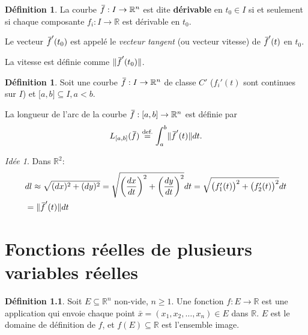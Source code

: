 \documentclass{report}
\theoremstyle{plain}
\theoremstyle{definition}
\newtheorem{defn}[thm]{Définition}
\theoremstyle{remark}
\newtheorem*{idea}{Idée}
\newcommand*\eqdef{\; \stackrel{ \mathclap{ \normalfont\text{def.} } }{ = } \;} %
\newcommand*{\skol}[2][3]{{}\mkern#1mu\overline{\mkern-#1mu#2}} %
\newcommand*\adh[1]{\skol{#1}}
\newcommand*{\norm}[1]{\lVert#1\rVert}
\begin{document}
\begin{defn}
	La courbe $\adh f : I \to \mathbb R^n$ est dite \textbf{dérivable} en $t_0 \in I$ si et seulement si chaque composante $f_i : I \to \mathbb R$ est dérivable en $t_0$. \par
	Le vecteur $\adh f'(t_0)$ est appelé le \emph{vecteur tangent} (ou vecteur vitesse) de $\adh f'(t)$ en $t_0$. \par
	La vitesse est définie comme $\norm{\adh f'(t_0)}$.
\end{defn}

\begin{defn}
	Soit une courbe $\adh f : I \to \mathbb R^n$ de classe $C'$ ($f_i'(t)$ sont continues sur $I$) et $\mathopen[a, b \mathclose] \subseteq I, a < b$. \par 
	La longueur de l'arc de la courbe $\adh f : \mathopen[a, b \mathclose] \to \mathbb R^n$ est définie par
	\begin{equation}
		L_{\mathopen[a, b \mathclose]}(\adh f) \eqdef \int_a^b \norm{\adh f'(t)} dt.
	\end{equation}
\end{defn}
\begin{idea}
	Dans $\mathbb R^2$:
	\begin{align*}
		&dl \approx \sqrt{(dx)^2 + (dy)^2} = \sqrt{\left(\frac{dx}{dt}\right)^2 + \left(\frac{dy}{dt}\right)^2}dt = \sqrt{\bigl(f_1'(t)\bigr)^2 + \bigl(f_2'(t)\bigr)^2}dt \\
		&= \norm{\adh f'(t)}dt
	\end{align*}
\end{idea}

\chapter{Fonctions réelles de plusieurs variables réelles}

\begin{defn}
	Soit $E \subseteq \mathbb R^n$ non-vide, $n \geq 1$. Une fonction $f : E \to \mathbb R$ est une application qui envoie chaque point $\bar x = (x_1, x_2, \ldots, x_n) \in E$ dans $\mathbb R$. $E$ est le domaine de définition de $f$, et $f(E) \subseteq \mathbb R$ est l'ensemble image.
\end{defn}
\end{document}
